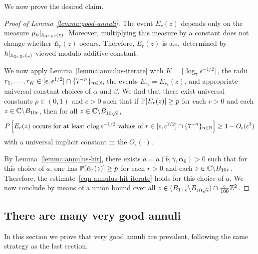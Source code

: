 \documentclass[12pt]{amsart}
\numberwithin{equation}{section}
\begin{document}
	We now prove the desired claim.
	
	
	\begin{proof}[Proof of Lemma~\ref{lemma:good-annuli}]
		The event $E_r(z)$ depends only on the measure $\mu_h|_{\A_{3 r,5r}(z)}$. Moreover, multiplying this measure by a constant does not change whether $E_r(z)$ occurs. 
		Therefore, $E_r(z)$ is a.s.\ determined by $h|_{\A_{3 r,5r}(z)}$ viewed modulo additive constant.
		
		We now apply Lemma~\ref{lemma:annulus-iterate} with $K = \lfloor \log_7  \epsilon^{-1/2} \rfloor$, the radii $r_1,\dots,r_K \in [ \epsilon, \epsilon^{1/2}] \cap \{7^{-n}\}_{n\in\N}$, the events $E_{r_k} = E_{r_k}(z)$, and appropriate universal constant choices of $\alpha$ and $\beta$. We find that there exist universal constants $p\in (0,1)$ and $c>0$ such that if $\P[E_r(z)] \geq p$
		for each $r > 0$ and each $z \in \C \backslash B_{10 r}$,  then for all $z \in \C \backslash B_{10 \sqrt{\epsilon}}$, 
		\begin{equation} \label{eqn-annulus-hit-iterate}
		P\left[ \text{$E_r(z)$ occurs for at least $c\log\epsilon^{-1/2}$ values of $r \in [ \epsilon, \epsilon^{1/2}] \cap \{7^{-n}\}_{n\in\N}$} \right] \geq 1 - O_\epsilon(\epsilon^3) 
		\end{equation} 
		with a universal implicit constant in the $O_\epsilon(\cdot)$. 
		
		By Lemma~\ref{lemma:annulus-hit}, there exists $a = a(b,\gamma,\boldsymbol{\alpha}_0) > 0$ such that for this choice of $a$, one has $\P[E_r(z)] \geq p$ for each $r > 0$ and each $z \in \C \backslash B_{10 r}$. Therefore, the estimate~\eqref{eqn-annulus-hit-iterate} holds for this choice of $a$. We now conclude by means of a union bound over all $z\in  (B_{1 + \epsilon} \backslash B_{10 \sqrt{\epsilon}}) \cap \frac{\epsilon}{100} \Z^2$. 
	\end{proof}
	
	
	\subsection{There are many very good annuli} \label{subsec:very-good-annuli-are-prevalent}
	In this section we prove that very good annuli are prevalent, following the same strategy as the last section. 
	
\end{document}
